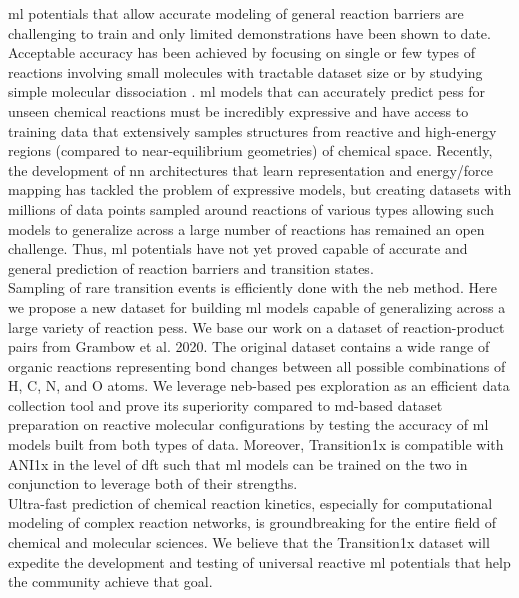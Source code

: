 \documentclass[twoside,twocolumn]{article}
\begin{document}
\gls{ml} potentials that allow accurate modeling of general reaction barriers are challenging to train and only limited demonstrations have been shown to date. Acceptable accuracy has been achieved by focusing on single or few types of reactions involving small molecules with tractable dataset size \cite{lu2018rate, young2021transferable, manzhos2020neural, qmrxn} or by studying simple molecular dissociation \cite{malshe2007theoretical}. \gls{ml} models that can accurately predict \glspl{pes} for unseen chemical reactions must be incredibly expressive and have access to training data that extensively samples structures from reactive and high-energy regions (compared to near-equilibrium geometries) of chemical space. Recently, the development of \gls{nn} architectures that learn representation and energy/force mapping\cite{unke2021machine} has tackled the problem of expressive models, but creating datasets with millions of data points sampled around reactions of various types allowing such models to generalize across a large number of reactions has remained an open challenge. Thus, \gls{ml} potentials have not yet proved capable of accurate and general prediction of reaction barriers and transition states. 
\\

Sampling of rare transition events is efficiently done with the \gls{neb} method\cite{neb}. Here we propose a new dataset for building \gls{ml} models capable of generalizing across a large variety of reaction \glspl{pes}. We base our work on a dataset of reaction-product pairs from Grambow et al. 2020\cite{rxns}. The original dataset contains a wide range of organic reactions representing bond changes between all possible combinations of H, C, N, and O atoms. We leverage \gls{neb}-based \gls{pes} exploration as an efficient data collection tool and prove its superiority compared to \gls{md}-based dataset preparation on reactive molecular configurations by testing the accuracy of \gls{ml} models built from both types of data. Moreover, Transition1x is compatible with ANI1x in the level of \gls{dft} such that \gls{ml} models can be trained on the two in conjunction to leverage both of their strengths.
\\

Ultra-fast prediction of chemical reaction kinetics, especially for computational modeling of complex reaction networks, is groundbreaking for the entire field of chemical and molecular sciences. We believe that the Transition1x dataset will expedite the development and testing of universal reactive \gls{ml} potentials that help the community achieve that goal.
\end{document}
